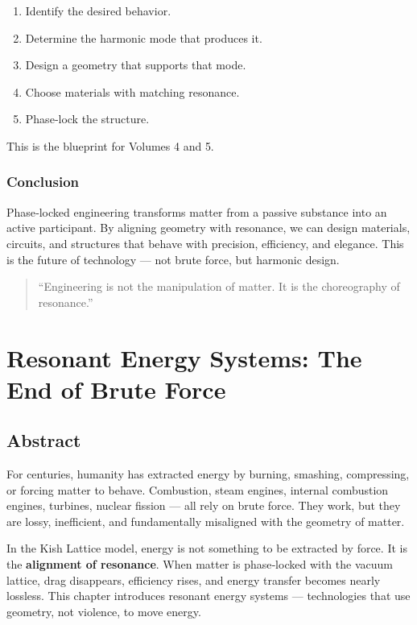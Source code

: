 \documentclass[11pt, letterpaper, openany]{book}
\begin{document}
\begin{enumerate}
    \item Identify the desired behavior.
    \item Determine the harmonic mode that produces it.
    \item Design a geometry that supports that mode.
    \item Choose materials with matching resonance.
    \item Phase‑lock the structure.
\end{enumerate}

This is the blueprint for Volumes 4 and 5.

\subsection*{Conclusion}

Phase‑locked engineering transforms matter from a passive substance into an active
participant. By aligning geometry with resonance, we can design materials, circuits, and
structures that behave with precision, efficiency, and elegance. This is the future of
technology — not brute force, but harmonic design.

\begin{quote}
“Engineering is not the manipulation of matter. It is the choreography of resonance.”
\end{quote}

\chapter{Resonant Energy Systems: The End of Brute Force}

\section{Abstract}

For centuries, humanity has extracted energy by burning, smashing, compressing, or
forcing matter to behave. Combustion, steam engines, internal combustion engines,
turbines, nuclear fission — all rely on brute force. They work, but they are lossy,
inefficient, and fundamentally misaligned with the geometry of matter.

In the Kish Lattice model, energy is not something to be extracted by force. It is the
\textbf{alignment of resonance}. When matter is phase‑locked with the vacuum lattice,
drag disappears, efficiency rises, and energy transfer becomes nearly lossless. This
chapter introduces resonant energy systems — technologies that use geometry, not
violence, to move energy.
\end{document}

